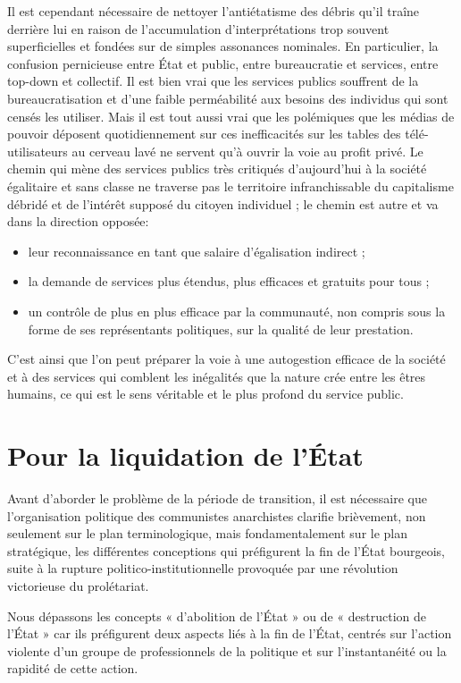 Il est cependant nécessaire de nettoyer l'antiétatisme des débris qu'il traîne derrière lui en raison de l'accumulation d'interprétations trop souvent superficielles et fondées sur de simples assonances nominales. En particulier, la confusion pernicieuse entre État et public, entre bureaucratie et services, entre top-down et collectif. Il est bien vrai que les services publics souffrent de la bureaucratisation et d'une faible perméabilité aux besoins des individus qui sont censés les utiliser. Mais il est tout aussi vrai que les polémiques que les médias de pouvoir déposent quotidiennement sur ces inefficacités sur les tables des télé-utilisateurs au cerveau lavé ne servent qu'à ouvrir la voie au profit privé. Le chemin qui mène des services publics très critiqués d'aujourd'hui à la société égalitaire et sans classe ne traverse pas le territoire infranchissable du capitalisme débridé et de l'intérêt supposé du citoyen individuel ; le chemin est autre et va dans la direction opposée:

\begin{itemize}
\item leur reconnaissance en tant que salaire d'égalisation indirect ;
\item la demande de services plus étendus, plus efficaces et gratuits pour tous ;
\item un contrôle de plus en plus efficace par la communauté, non compris sous la forme de ses représentants politiques, sur la qualité de leur prestation.
\end{itemize}

C'est ainsi que l'on peut préparer la voie à une autogestion efficace de la société et à des services qui comblent les inégalités que la nature crée entre les êtres humains, ce qui est le sens véritable et le plus profond du service public.

\chapter{Pour la liquidation de l'État}

Avant d'aborder le problème de la période de transition, il est nécessaire que l'organisation politique des communistes anarchistes clarifie brièvement, non seulement sur le plan terminologique, mais fondamentalement sur le plan stratégique, les différentes conceptions qui préfigurent la fin de l'État bourgeois, suite à la rupture politico-institutionnelle provoquée par une révolution victorieuse du prolétariat.

Nous dépassons les concepts « d'abolition de l'État » ou de « destruction de l'État » car ils préfigurent deux aspects liés à la fin de l'État, centrés sur l'action violente d'un groupe de professionnels de la politique et sur l'instantanéité ou la rapidité de cette action.

